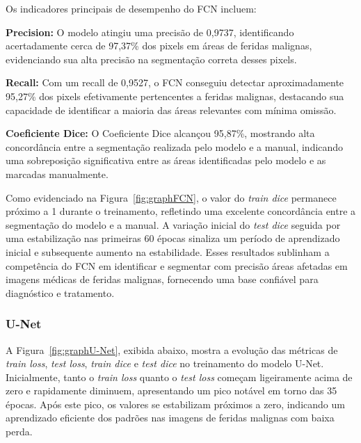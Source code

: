 Os indicadores principais de desempenho do \ac{FCN} incluem:

\textbf{Precision:} O modelo atingiu uma precisão de 0,9737, identificando acertadamente cerca de 97,37\% dos pixels em áreas de feridas malignas, evidenciando sua alta precisão na segmentação correta desses pixels.

\textbf{Recall:} Com um recall de 0,9527, o \ac{FCN} conseguiu detectar aproximadamente 95,27\% dos pixels efetivamente pertencentes a feridas malignas, destacando sua capacidade de identificar a maioria das áreas relevantes com mínima omissão.

\textbf{Coeficiente Dice:} O Coeficiente Dice alcançou 95,87\%, mostrando alta concordância entre a segmentação realizada pelo modelo e a manual, indicando uma sobreposição significativa entre as áreas identificadas pelo modelo e as marcadas manualmente.

Como evidenciado na Figura~\ref{fig:graphFCN}, o valor do \textit{train dice} permanece próximo a 1 durante o treinamento, refletindo uma excelente concordância entre a segmentação do modelo e a manual. A variação inicial do \textit{test dice} seguida por uma estabilização nas primeiras 60 épocas sinaliza um período de aprendizado inicial e subsequente aumento na estabilidade. Esses resultados sublinham a competência do \ac{FCN} em identificar e segmentar com precisão áreas afetadas em imagens médicas de feridas malignas, fornecendo uma base confiável para diagnóstico e tratamento.

\subsubsection{U-Net}
A Figura~\ref{fig:graphU-Net}, exibida abaixo, mostra a evolução das métricas de \textit{train loss}, \textit{test loss}, \textit{train dice} e \textit{test dice} no treinamento do modelo \ac{U-Net}. Inicialmente, tanto o \textit{train loss} quanto o \textit{test loss} começam ligeiramente acima de zero e rapidamente diminuem, apresentando um pico notável em torno das 35 épocas. Após este pico, os valores se estabilizam próximos a zero, indicando um aprendizado eficiente dos padrões nas imagens de feridas malignas com baixa perda.


